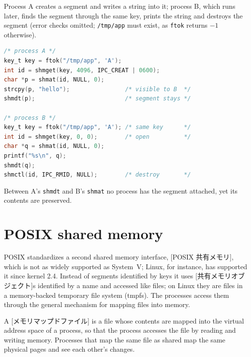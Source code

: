 \documentclass[../main.tex]{subfiles}
\begin{document}
\begin{example}
  \label{ex:l09-sysv}
  Process A creates a segment and writes a string into it; process B, which
  runs later, finds the segment through the same key, prints the string and
  destroys the segment (error checks omitted; \texttt{/tmp/app} must exist,
  as \texttt{ftok} returns $-1$ otherwise).
  \begin{lstlisting}[language=C, numbers=none]
/* process A */
key_t key = ftok("/tmp/app", 'A');
int id = shmget(key, 4096, IPC_CREAT | 0600);
char *p = shmat(id, NULL, 0);
strcpy(p, "hello");                /* visible to B  */
shmdt(p);                          /* segment stays */

/* process B */
key_t key = ftok("/tmp/app", 'A'); /* same key      */
int id = shmget(key, 0, 0);        /* open          */
char *q = shmat(id, NULL, 0);
printf("%s\n", q);
shmdt(q);
shmctl(id, IPC_RMID, NULL);        /* destroy       */
\end{lstlisting}
  Between A's \texttt{shmdt} and B's \texttt{shmat} no process has the
  segment attached, yet its contents are preserved.
\end{example}

\section{POSIX shared memory}
\label{sec:l09-posix}

POSIX standardizes a second shared memory interface,
[POSIX 共有メモリ], which is not as widely
supported as System~V; Linux, for instance, has supported it since kernel
2.4.  Instead
of segments identified by keys it uses [共有メモリオブジェクト]s identified by a name and accessed like
files; on Linux they are files in a memory-backed temporary file system
(tmpfs).  The processes access them through the general mechanism for
mapping files into memory.

\begin{definition}
  A [メモリマップドファイル] is a file whose
  contents are mapped into the virtual address space of a process, so that
  the process accesses the file by reading and writing memory.  Processes
  that map the same file as shared map the same physical pages and see each
  other's changes.
\end{definition}
\end{document}
